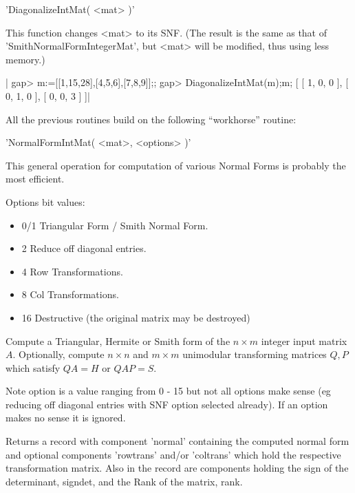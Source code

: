 'DiagonalizeIntMat( <mat> )'

This  function changes <mat> to its SNF. (The result is the same as that of
'SmithNormalFormIntegerMat',  but <mat>  will be  modified, thus using less
memory.)

|    gap> m:=[[1,15,28],[4,5,6],[7,8,9]];;
    gap> DiagonalizeIntMat(m);m;
    [ [ 1, 0, 0 ], [ 0, 1, 0 ], [ 0, 0, 3 ] ]|


All  the previous  routines build  on the  following ``workhorse'' routine:

'NormalFormIntMat( <mat>, <options> )'

This  general operation for computation of various Normal Forms is probably
the most efficient.

Options bit values:
\begin{itemize}
\item{0/1} Triangular Form / Smith Normal Form.

\item{2}   Reduce off diagonal entries.

\item{4}   Row Transformations.

\item{8}   Col Transformations.

\item{16}   Destructive (the original matrix may be destroyed)
\end{itemize}

Compute  a Triangular, Hermite  or Smith form  of the $n  \times m$ integer
input  matrix  $A$.  Optionally,  compute  $n  \times  n$  and $m \times m$
unimodular  transforming matrices $Q, P$  which satisfy $QA =  H$ or $QAP =
S$.

Note  option is a value ranging from 0  - 15 but not all options make sense
(eg  reducing off diagonal entries with SNF option selected already). If an
option makes no sense it is ignored.

Returns  a record  with component  'normal' containing  the computed normal
form  and optional components  'rowtrans' and/or 'coltrans'  which hold the
respective transformation matrix. Also in the record are components holding
the sign of the determinant, signdet, and the Rank of the matrix, rank.


